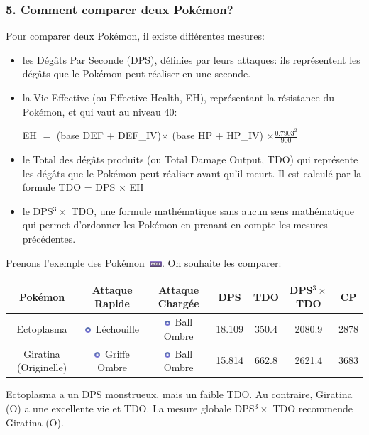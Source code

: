 \documentclass[12pt]{beamer}
\newcommand{\ghostfull}{\includegraphics[height=0.2cm]{../../../images/type/full/Ghost.png}}
\newcommand{\ghostsimp}{\includegraphics[height=0.2cm]{../../../images/type/simplified/ghost.png}}
\begin{document}
\begin{frame}
\frametitle{5. Comment comparer deux Pok\'emon?}

\begin{block}{}
\begin{footnotesize}

Pour comparer deux Pok\'emon, il existe différentes mesures:
\begin{itemize}
  \item les Dégâts Par Seconde (DPS), définies par leurs attaques: ils représentent les dégâts que le Pok\'emon peut réaliser en une seconde.
  \item la Vie Effective (ou Effective Health, EH), représentant la résistance du Pok\'emon, et qui vaut au niveau 40:
\begin{center}
EH $=$ (base DEF + DEF\_IV)$\times$ (base HP + HP\_IV) $\times \frac{0.7903^2}{900}$
\end{center}
  \item le Total des dégâts produits (ou Total Damage Output, TDO) qui représente les dégâts que le Pok\'emon peut réaliser avant qu'il meurt. Il est calculé par la formule TDO = DPS $\times$ EH
  \item le DPS$^3 \times$ TDO, une formule mathématique sans aucun sens mathématique qui permet d'ordonner les Pok\'emon en prenant en compte les mesures précédentes.
\end{itemize} 

\begin{center}
   \href{https://pokemongo.gamepress.gg/comprehensive-dps-spreadsheet}{}
\end{center}

Prenons l'exemple des Pok\'emon~\ghostfull. On souhaite les comparer:
\begin{center}
\begin{tabular}{ccccccc}
Pokémon & Attaque Rapide & Attaque Chargée & DPS & TDO & DPS$^3 \times$ TDO & CP \\ \hline
Ectoplasma &	\ghostsimp~Léchouille	&\ghostsimp~Ball Ombre &18.109	&350.4	&2080.9	&2878\\ 
Giratina (Originelle)&	\ghostsimp~Griffe Ombre	&\ghostsimp~Ball Ombre &	15.814	&662.8	&2621.4	&3683\\ 
\end{tabular}
\end{center}

Ectoplasma a un DPS monstrueux, mais un faible TDO. Au contraire, Giratina (O) a une excellente vie et TDO. La mesure globale DPS$^3 \times$ TDO recommende Giratina (O).


\end{footnotesize}
\end{block}
\end{frame}
\end{document}
